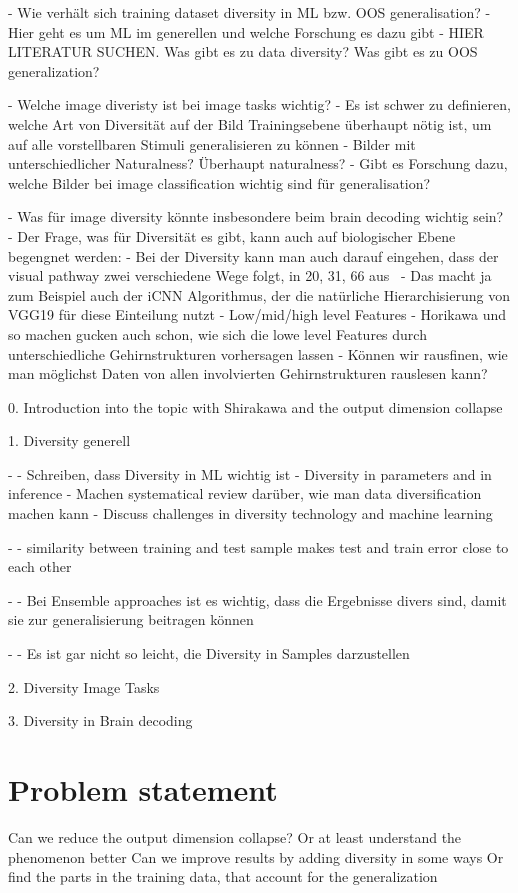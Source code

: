 - Wie verhält sich training dataset diversity in ML bzw. OOS generalisation?
    - Hier geht es um ML im generellen und welche Forschung es dazu gibt
    - HIER LITERATUR SUCHEN. Was gibt es zu data diversity? Was gibt es zu OOS generalization?

- Welche image diveristy ist bei image tasks wichtig?
    - Es ist schwer zu definieren, welche Art von Diversität auf der Bild Trainingsebene überhaupt nötig ist, um auf alle vorstellbaren Stimuli generalisieren zu können
    - Bilder mit unterschiedlicher Naturalness? Überhaupt naturalness?
    - Gibt es Forschung dazu, welche Bilder bei image classification wichtig sind für generalisation?

- Was für image diversity könnte insbesondere beim brain decoding wichtig sein?
    - Der Frage, was für Diversität es gibt, kann auch auf biologischer Ebene begengnet werden:
    - Bei der Diversity kann man auch darauf eingehen, dass der visual pathway zwei verschiedene Wege folgt, in 20, 31, 66 aus~\cite{chenExploringNaturalnessAIGenerated2023}
    - Das macht ja zum Beispiel auch der iCNN Algorithmus, der die natürliche Hierarchisierung von VGG19 für diese Einteilung nutzt
        - Low/mid/high level Features
    - Horikawa und so machen gucken auch schon, wie sich die lowe level Features durch unterschiedliche Gehirnstrukturen vorhersagen lassen
    - Können wir rausfinen, wie man möglichst Daten von allen involvierten Gehirnstrukturen rauslesen kann?


0. Introduction into the topic with Shirakawa and the output dimension collapse

1. Diversity generell

- \cite{gongDiversityMachineLearning2019} 
    - Schreiben, dass Diversity in ML wichtig ist
    - Diversity in parameters and in inference
    - Machen systematical review darüber, wie man data diversification machen kann
    - Discuss challenges in diversity technology and machine learning

- \cite{xuRobustnessGeneralization2012}
    - similarity between training and test sample makes test and train error close to each other

- \cite{JMLR:v6:brown05a}
    - Bei Ensemble approaches ist es wichtig, dass die Ergebnisse divers sind, damit sie zur generalisierung beitragen können

- \cite{Kuncheva2003Measures}
    - Es ist gar nicht so leicht, die Diversity in Samples darzustellen

2. Diversity Image Tasks




3. Diversity in Brain decoding



\section{Problem statement}
Can we reduce the output dimension collapse?
    Or at least understand the phenomenon better
Can we improve results by adding diversity in some ways
    Or find the parts in the training data, that account for the generalization